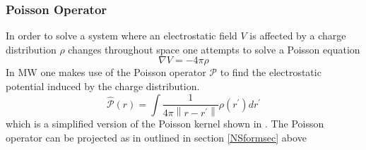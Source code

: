 \documentclass[../master_thesis.tex]{subfiles}
\begin{document}
\subsubsection{Poisson Operator}
In order to solve a system where an electrostatic field $V$ is affected by a
charge distribution $\rho$ changes throughout space one attempts to solve a Poisson equation
\begin{equation}
  \nabla V = -4\pi \rho
\end{equation}
In \ac{MW} one makes use of the Poisson operator $\mathscr{P}$ to
find the electrostatic potential induced by the charge distribution.
\begin{equation}\label{eq:Poissonopmw}
\hat{\mathscr{P}}(r)=\int \frac{1}{4 \pi\left\|r-r^{\prime}\right\|} \rho\left(r^{\prime}\right)
d r^{\prime}
\end{equation}
which is a simplified version of the Poisson kernel shown in \cite{Frediani:2013}.
The Poisson operator can be projected as in outlined in section \ref{NSformsec} above



\biblio
\end{document}
